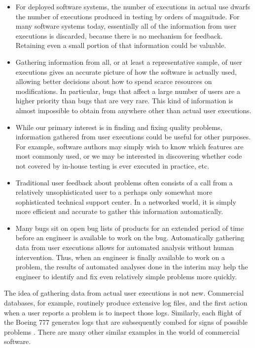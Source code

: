 \begin{itemize}
  
\item For deployed software systems, the number of executions in
  actual use dwarfs the number of executions produced in testing by
  orders of magnitude.  For many software systems today, essentially
  all of the information from user executions is discarded, because
  there is no mechanism for feedback.  Retaining even a small portion
  of that information could be valuable.
  
\item Gathering information from all, or at least a representative
  sample, of user executions gives an accurate picture of how the
  software is actually used, allowing better decisions about how to
  spend scarce resources on modifications. In particular, bugs that
  affect a large number of users are a higher priority than bugs that
  are very rare.  This kind of information is almost impossible to
  obtain from anywhere other than actual user executions.
  
\item While our primary interest is in finding and fixing quality
  problems, information gathered from user executions could be useful
  for other purposes.  For example, software authors may simply wish
  to know which features are most commonly used, or we may be
  interested in discovering whether code not covered by in-house
  testing is ever executed in practice, etc.
  
\item Traditional user feedback about problems often consists of a
  call from a relatively unsophisticated user to a perhaps only
  somewhat more sophisticated technical support center.  In a
  networked world, it is simply more efficient and accurate to gather
  this information automatically.
  
\item Many bugs sit on open bug lists of products for an extended
  period of time before an engineer is available to work on the bug.
  Automatically gathering data from user executions allows for
  automated analysis without human intervention.  Thus, when an
  engineer is finally available to work on a problem, the results of
  automated analyses done in the interim may help the engineer to
  identify and fix even relatively simple problems more quickly.
\end{itemize}

The idea of gathering data from actual user executions is not new.
Commercial databases, for example, routinely produce extensive log
files, and the first action when a user reports a problem is to
inspect those logs.  Similarly, each flight of the Boeing 777
generates logs that are subsequently combed for signs of possible
problems \cite{Esler:2001:WVR}.  There are many other similar examples
in the world of commercial software.

